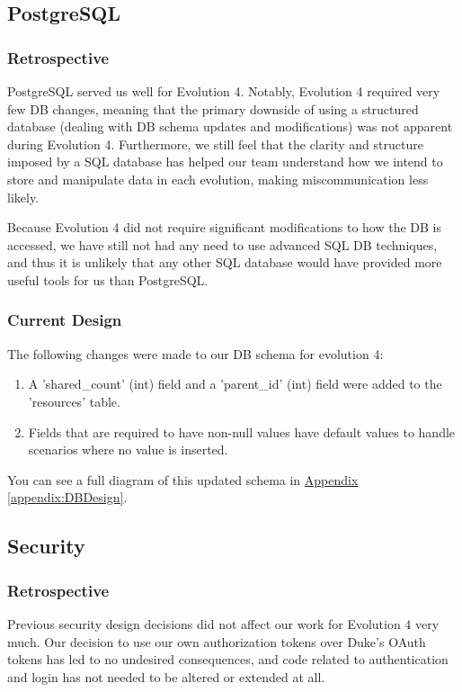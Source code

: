 \documentclass[12pt]{article}
\begin{document}
\subsection{PostgreSQL}
\subsubsection{Retrospective}
PostgreSQL served us well for Evolution 4. Notably, Evolution 4 required very few DB changes, meaning that the primary downside of using a structured database (dealing with DB schema updates and modifications) was not apparent during Evolution 4. Furthermore, we still feel that the clarity and structure imposed by a SQL database has helped our team understand how we intend to store and manipulate data in each evolution, making miscommunication less likely. 

Because Evolution 4 did not require significant modifications to how the DB is accessed, we have still not had any need to use advanced SQL DB techniques, and thus it is unlikely that any other SQL database would have provided more useful tools for us than PostgreSQL. 


\subsubsection{Current Design}
The following changes were made to our DB schema for evolution 4:

\begin{enumerate}
    \item A 'shared\_count' (int) field and a 'parent\_id' (int) field were added to the 'resources' table. 
    \item Fields that are required to have non-null values have default values to handle scenarios where no value is inserted. 

\end{enumerate}

You can see a full diagram of this updated schema in  \hyperref[appendix:DBDesign]{Appendix \ref{appendix:DBDesign}}. 

\subsection{Security}
\subsubsection{Retrospective}
Previous security design decisions did not affect our work for Evolution 4 very much. Our decision to use our own authorization tokens over Duke's OAuth tokens has led to no undesired consequences, and code related to authentication and login has not needed to be altered or extended at all. 
\end{document}
